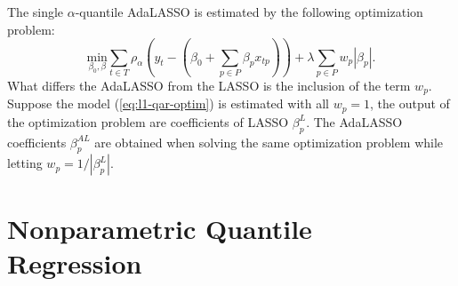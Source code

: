 The single $\alpha$-quantile AdaLASSO is estimated by the following optimization problem:
\begin{equation}
\underset{\beta_{0},\beta}{\text{min}} \sum_{t \in T} \rho_\alpha(y_t - (\beta_0 + \sum_{p \in P} \beta_p x_{tp})) +\lambda \sum_{p \in P} w_p | \beta_p |.\label{eq:l1-qar-optim} 
\end{equation}
What differs the AdaLASSO from the LASSO is the inclusion of the term $w_p$. Suppose the model (\ref{eq:l1-qar-optim}) is estimated with all $w_{p}=1$, the output of the optimization problem are coefficients of LASSO  $\beta^{L}_{p}$. The AdaLASSO coefficients $\beta^{AL}_{p}$ are obtained when solving the same optimization problem while letting $w_{p}=1/|\beta^{L}_{p}|$. 






\section{Nonparametric Quantile Regression}
\label{sec:npqar}

